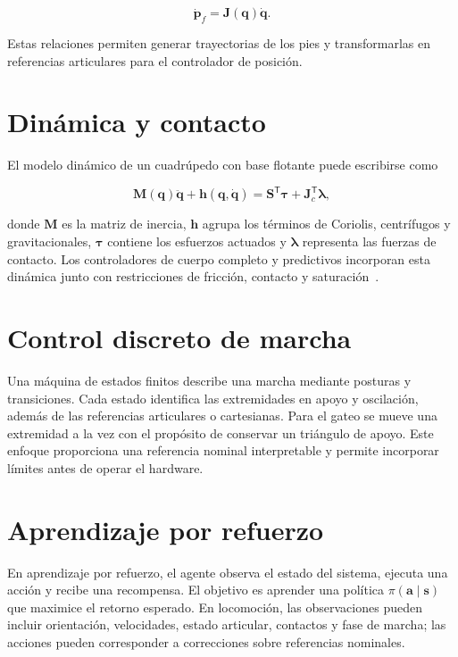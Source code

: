 \begin{equation}
    \dot{\mathbf{p}}_{f}=\mathbf{J}(\mathbf{q})\dot{\mathbf{q}}.
    \label{eq:jacobiano}
\end{equation}

Estas relaciones permiten generar trayectorias de los pies y transformarlas en referencias articulares para el controlador de posición.

\section{Dinámica y contacto}

El modelo dinámico de un cuadrúpedo con base flotante puede escribirse como

\begin{equation}
    \mathbf{M}(\mathbf{q})\ddot{\mathbf{q}}+
    \mathbf{h}(\mathbf{q},\dot{\mathbf{q}})=
    \mathbf{S}^{\mathsf{T}}\boldsymbol{\tau}+
    \mathbf{J}_{c}^{\mathsf{T}}\boldsymbol{\lambda},
    \label{eq:dinamica}
\end{equation}

donde $\mathbf{M}$ es la matriz de inercia, $\mathbf{h}$ agrupa los términos de Coriolis, centrífugos y gravitacionales, $\boldsymbol{\tau}$ contiene los esfuerzos actuados y $\boldsymbol{\lambda}$ representa las fuerzas de contacto. Los controladores de cuerpo completo y predictivos incorporan esta dinámica junto con restricciones de fricción, contacto y saturación~\cite{bellicoso2018dynamic,dicarlo2018mpc,neunert2018wholebody}.

\section{Control discreto de marcha}

Una máquina de estados finitos describe una marcha mediante posturas y transiciones. Cada estado identifica las extremidades en apoyo y oscilación, además de las referencias articulares o cartesianas. Para el gateo se mueve una extremidad a la vez con el propósito de conservar un triángulo de apoyo. Este enfoque proporciona una referencia nominal interpretable y permite incorporar límites antes de operar el hardware.

\section{Aprendizaje por refuerzo}

En aprendizaje por refuerzo, el agente observa el estado del sistema, ejecuta una acción y recibe una recompensa. El objetivo es aprender una política $\pi(\mathbf{a}\mid\mathbf{s})$ que maximice el retorno esperado. En locomoción, las observaciones pueden incluir orientación, velocidades, estado articular, contactos y fase de marcha; las acciones pueden corresponder a correcciones sobre referencias nominales.

